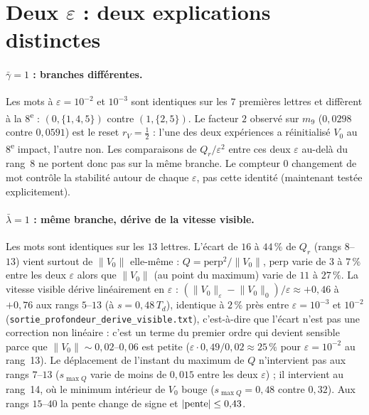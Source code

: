 \documentclass[11pt,a4paper]{article}
\theoremstyle{remark}
\newcommand{\norm}[1]{\lVert #1\rVert}
\begin{document}
\section{Deux $\varepsilon$ : deux explications distinctes}\label{sec:eps}
\paragraph{$\bar\gamma=1$ : branches diff\'erentes.} Les mots \`a $\varepsilon=10^{-2}$ et $10^{-3}$ sont identiques sur les $7$ premi\`eres lettres et diff\`erent \`a la $8$\textsuperscript{e} : $(0,\{1,4,5\})$ contre $(1,\{2,5\})$. Le facteur $2$ observ\'e sur $m_9$ ($0{,}0298$ contre $0{,}0591$) est le reset $r_V=\frac12$ : l'une des deux exp\'eriences a r\'einitialis\'e $V_0$ au 8\textsuperscript{e} impact, l'autre non. Les comparaisons de $Q_r/\varepsilon^2$ entre ces deux $\varepsilon$ au-del\`a du rang~8 ne portent donc pas sur la m\^eme branche. Le compteur \og $0$ changement de mot \fg{} contr\^ole la stabilit\'e autour de chaque $\varepsilon$, pas cette identit\'e (maintenant test\'ee explicitement).

\paragraph{$\bar\lambda=1$ : m\^eme branche, d\'erive de la vitesse visible.} Les mots sont identiques sur les $13$ lettres. L'\'ecart de $16$ \`a $44\,\%$ de $Q_r$ (rangs $8$--$13$) vient surtout de $\norm{V_0}$ elle-m\^eme : $Q=\mathrm{perp}^2/\norm{V_0}$, $\mathrm{perp}$ varie de $3$ \`a $7\,\%$ entre les deux $\varepsilon$ alors que $\norm{V_0}$ (au point du maximum) varie de $11$ \`a $27\,\%$. La vitesse visible d\'erive lin\'eairement en $\varepsilon$ : $(\norm{V_0}_\varepsilon-\norm{V_0}_0)/\varepsilon\approx+0{,}46$ \`a $+0{,}76$ aux rangs $5$--$13$ (\`a $s=0{,}48\,T_d$), identique \`a $2\,\%$ pr\`es entre $\varepsilon=10^{-3}$ et $10^{-2}$ (\texttt{sortie\_profondeur\_derive\_visible.txt}), c'est-\`a-dire que l'\'ecart n'est pas une correction non lin\'eaire : c'est un terme du premier ordre qui devient sensible parce que $\norm{V_0}\sim0{,}02$--$0{,}06$ est petite ($\varepsilon\cdot0{,}49/0{,}02\approx25\,\%$ pour $\varepsilon=10^{-2}$ au rang~13). Le d\'eplacement de l'instant du maximum de $Q$ n'intervient pas aux rangs $7$--$13$ ($s_{\max Q}$ varie de moins de $0{,}015$ entre les deux $\varepsilon$) ; il intervient au rang~14, o\`u le minimum int\'erieur de $V_0$ bouge ($s_{\max Q}=0{,}48$ contre $0{,}32$). Aux rangs $15$--$40$ la pente change de signe et $|{\rm pente}|\le0{,}43$.
\end{document}
